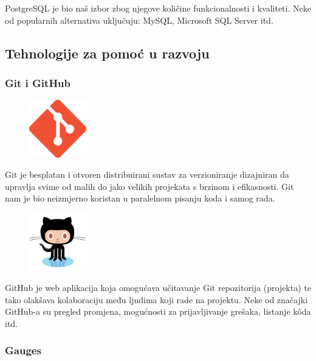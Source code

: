 \documentclass{scrreprt}
\begin{document}
PostgreSQL je bio naš izbor zbog njegove količine funkcionalnosti i kvaliteti.
Neke od popularnih alternativa uključuju: MySQL, Microsoft SQL Server itd.

\subsection{Tehnologije za pomoć u razvoju}

\subsubsection{Git i GitHub}

\begin{figure}
  \vspace{-10pt}
  \includegraphics[width=2.5cm]{logos/git}
  \vspace{-30pt}
\end{figure}

Git je besplatan i otvoren distribuirani sustav za verzioniranje dizajniran da
upravlja svime od malih do jako velikih projekata s brzinom i
efikasnosti.\cite{git} Git nam je bio neizmjerno koristan u paralelnom pisanju
koda i samog rada.

\begin{figure}
  \vspace{-10pt}
  \includegraphics[width=2.5cm]{logos/github}
  \vspace{-30pt}
\end{figure}

GitHub je web aplikacija koja omogućava učitavanje Git repozitorija (projekta)
te tako olakšava kolaboraciju među ljudima koji rade na projektu.\cite{github}
Neke od značajki GitHub-a su pregled promjena, mogućnosti za prijavljivanje
grešaka, listanje kôda itd.

\subsubsection{Gauges}
\end{document}
